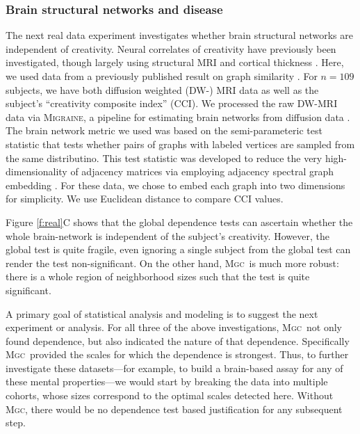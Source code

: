 \documentclass[11pt]{article}
\newcommand{\note}[2][]{\added[#1,remark={#2}]{}}
\providecommand{\sct}[1]{{\normalfont\textsc{#1}}}
\newcommand{\Migraine}{\sct{Migraine}}
\newcommand{\Mgc}{\sct{Mgc}}
\newcommand{\jv}[1]{{\note{jv: #1}}}
\begin{document}
\subsubsection*{Brain structural networks and disease}

The next real data experiment investigates whether brain structural networks are independent of creativity.  Neural correlates of creativity have previously been investigated, though largely using structural MRI and cortical thickness \cite{Jung2009}.  Here, we used data from a previously published result on graph similarity \cite{Koutra15a}. For  $n=109$ subjects, we have both diffusion weighted (DW-) MRI data as well as the subject's ``creativity composite index'' (CCI).  We processed the raw DW-MRI data via \Migraine, a pipeline for estimating brain networks from diffusion data \cite{Migraine}.   
The brain network metric we used was based on  the semi-parameteric test statistic \cite{Tang2016} that tests whether pairs of graphs with labeled vertices are sampled from the same distributino.  This test statistic was developed to reduce  the very high-dimensionality of adjacency matrices via employing adjacency spectral graph embedding  \cite{Sussman2013}. For these data, we chose to embed each graph into two dimensions for simplicity. We use Euclidean distance to compare CCI values. 
\jv{missing migrain citation?}


Figure \ref{f:real}C shows that the global dependence tests can ascertain whether the whole brain-network is independent of the subject's creativity.  However, the global test is quite fragile, even ignoring a single subject from the global test can render the test non-significant. On the other hand, \Mgc~is much more robust: there is a whole region of neighborhood sizes such that the test is quite significant.  



A primary goal of statistical analysis and modeling is to suggest the next experiment or analysis.  For all three of the above investigations, \Mgc~not only found dependence, but also indicated the nature of that dependence.  Specifically \Mgc~provided the scales for which the dependence is strongest.  Thus, to further investigate these datasets---for example, to build a brain-based assay for any of these mental properties---we would start by breaking the data into multiple cohorts, whose sizes correspond to the optimal scales detected here.  Without \Mgc, there would be no dependence test based justification for any subsequent step.
\end{document}
